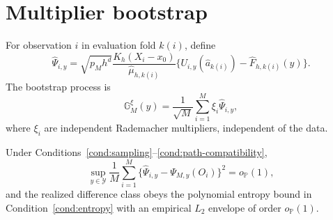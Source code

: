 \section{Multiplier bootstrap}
\label{sec:supp-bootstrap}

For observation \(i\) in evaluation fold \(k(i)\), define
\[
\widehat\Psi_{i,y}
=
\sqrt{p_Mh^d}
\frac{K_h(X_i-x_0)}{\widehat\mu_{h,k(i)}}
\{U_{i,y}(\widehat a_{k(i)})-\widehat F_{h,k(i)}(y)\}.
\]
The bootstrap process is
\[
\mathbb G_M^\xi(y)
=
\frac1{\sqrt M}\sum_{i=1}^M\xi_i\widehat\Psi_{i,y},
\]
where \(\xi_i\) are independent Rademacher multipliers, independent of the data.

\begin{lemma}
\label{lem:IF-replacement}
Under Conditions~\ref{cond:sampling}--\ref{cond:path-compatibility},
\begin{equation}
\sup_{y\in\mathcal Y}
\frac1M\sum_{i=1}^M
\{\widehat\Psi_{i,y}-\Psi_{M,y}(O_i)\}^2
=o_{\mathbb P}(1),
\label{eq:empirical-L2}
\end{equation}
and the realized difference class obeys the polynomial entropy bound in Condition~\ref{cond:entropy} with an empirical \(L_2\) envelope of order \(o_{\mathbb P}(1)\).
\end{lemma}

